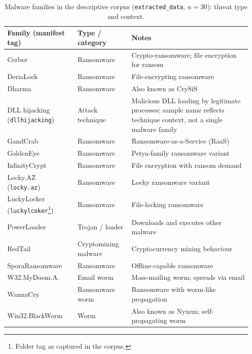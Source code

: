 \begin{table}[htbp]
\centering
\caption{Malware families in the descriptive corpus (\texttt{extracted\_data}, $n{=}30$): threat type and context.}
\label{tab:malware_family_taxonomy}
\footnotesize
\setlength{\tabcolsep}{4pt}
\renewcommand{\arraystretch}{1.2}
\begin{tabularx}{\textwidth}{@{}>{\raggedright\arraybackslash}p{2.6cm} >{\raggedright\arraybackslash}p{3.0cm} >{\raggedright\arraybackslash}X@{}}
\toprule
\textbf{Family (manifest tag)} & \textbf{Type / category} & \textbf{Notes} \\
\midrule
Cerber & Ransomware & Crypto-ransomware; file encryption for ransom \cite{mcafee2016cerber} \\
DeriaLock & Ransomware & File-encrypting ransomware \\
Dharma & Ransomware & Also known as CrySiS \\
DLL hijacking (\texttt{dllhijacking}) & Attack technique & Malicious DLL loading by legitimate processes; sample name reflects technique context, not a single malware family \\
GandCrab & Ransomware & Ransomware-as-a-Service (RaaS) \\
GoldenEye & Ransomware & Petya-family ransomware variant \\
InfinityCrypt & Ransomware & File encryption with ransom demand \\
Locky.AZ (\texttt{locky.az}) & Ransomware & Locky ransomware variant \cite{malwiki2026locky} \\
LuckyLocker (\texttt{luckylcoker}\footnote{Folder tag as captured in the corpus.}) & Ransomware & File-locking ransomware \\
PowerLoader & Trojan / loader & Downloads and executes other malware \cite{malvol2025londonmet} \\
RedTail & Cryptomining malware & Cryptocurrency mining behaviour \cite{malvol2025londonmet} \\
SporaRansomware & Ransomware & Offline-capable ransomware \\
W32.MyDoom.A. & Email worm & Mass-mailing worm; spreads via email \\
WannaCry & Ransomware worm & Ransomware with worm-like propagation \cite{mandiant2017wannacry} \\
Win32.BlackWorm & Worm & Also known as Nyxem; self-propagating worm \\
\bottomrule
\end{tabularx}
\end{table}
